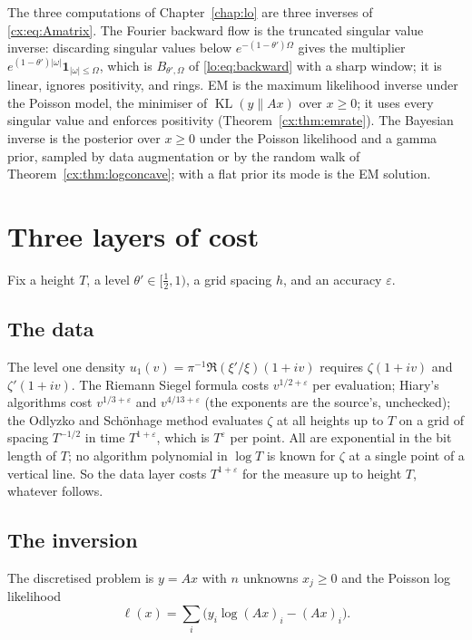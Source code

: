 The three computations of Chapter~\ref{chap:lo} are three inverses of \eqref{cx:eq:Amatrix}. The Fourier backward flow is the truncated singular value inverse: discarding singular values below $e^{-(1-\theta')\Omega}$ gives the multiplier $e^{(1-\theta')|\omega|}\mathbf 1_{|\omega|\le\Omega}$, which is $B_{\theta',\Omega}$ of \eqref{lo:eq:backward} with a sharp window; it is linear, ignores positivity, and rings. EM is the maximum likelihood inverse under the Poisson model, the minimiser of $\operatorname{KL}(y\|Ax)$ over $x\ge0$; it uses every singular value and enforces positivity (Theorem~\ref{cx:thm:emrate}). The Bayesian inverse is the posterior over $x\ge0$ under the Poisson likelihood and a gamma prior, sampled by data augmentation or by the random walk of Theorem~\ref{cx:thm:logconcave}; with a flat prior its mode is the EM solution.

\section{Three layers of cost}\label{cx:sec:cost}

Fix a height $T$, a level $\theta'\in[\tfrac12,1)$, a grid spacing $h$, and an accuracy $\varepsilon$.

\subsection{The data}

The level one density $u_1(v)=\pi^{-1}\Re(\xi'/\xi)(1+iv)$ requires $\zeta(1+iv)$ and $\zeta'(1+iv)$. The Riemann Siegel formula costs $v^{1/2+\varepsilon}$ per evaluation; Hiary's algorithms cost $v^{1/3+\varepsilon}$ \cite{Hiary11} and $v^{4/13+\varepsilon}$ (the exponents are the source's, unchecked); the Odlyzko and Sch\"onhage method \cite{OS88} evaluates $\zeta$ at all heights up to $T$ on a grid of spacing $T^{-1/2}$ in time $T^{1+\varepsilon}$, which is $T^{\varepsilon}$ per point. All are exponential in the bit length of $T$; no algorithm polynomial in $\log T$ is known for $\zeta$ at a single point of a vertical line. So the data layer costs $T^{1+\varepsilon}$ for the measure up to height $T$, whatever follows.

\subsection{The inversion}

The discretised problem is $y=Ax$ with $n$ unknowns $x_j\ge0$ and the Poisson log likelihood
\begin{equation}\label{cx:eq:loglik}
\ell(x)=\sum_i\bigl(y_i\log(Ax)_i-(Ax)_i\bigr).
\end{equation}

